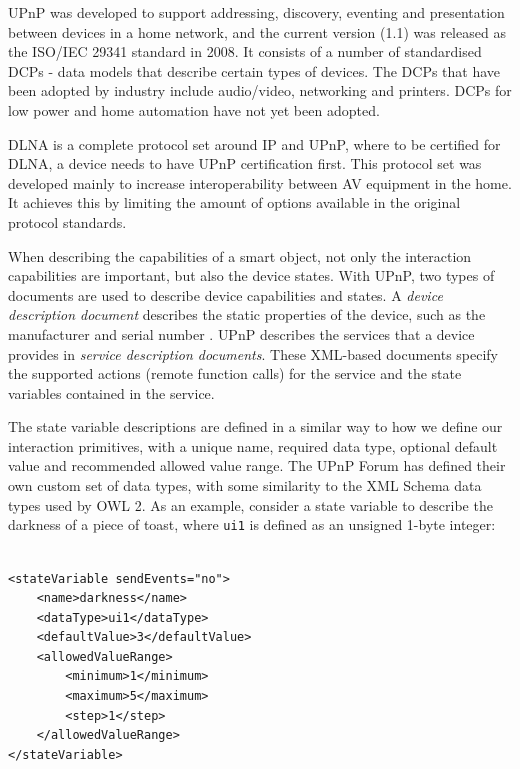 \ac{UPnP} was developed to support addressing, discovery, eventing and presentation between devices in a home network, and the current version (1.1) was released as the ISO/IEC 29341 standard in 2008. It consists of a number of standardised \acp{DCP} - data models that describe certain types of devices. The \acp{DCP} that have been adopted by industry include audio/video, networking and printers. \acp{DCP} for low power and home automation have not yet been adopted.

\ac{DLNA} is a complete protocol set around \ac{IP} and \ac{UPnP}, where to be certified for \ac{DLNA}, a device needs to have \ac{UPnP} certification first. This protocol set was developed mainly to increase interoperability between \ac{AV} equipment in the home. It achieves this by limiting the amount of options available in the original protocol standards.

When describing the capabilities of a smart object, not only the interaction capabilities are important, but also the device states. With \ac{UPnP}, two types of documents are used to describe device capabilities and states. A \emph{device description document} describes the static properties of the device, such as the manufacturer and serial number \cite{Jeronimo2009}. \ac{UPnP} describes the services that a device provides in \emph{service description documents}. These XML-based documents specify the supported actions (remote function calls) for the service and the state variables contained in the service. 

The state variable descriptions are defined in a similar way to how we define our interaction primitives, with a unique name, required data type, optional default value and recommended allowed value range. The \ac{UPnP} Forum has defined their own custom set of data types, with some similarity to the XML Schema data types used by \ac{OWL} 2. As an example, consider a state variable to describe the darkness of a piece of toast, where \texttt{ui1} is defined as an unsigned 1-byte integer:

\begin{verbatim}
	
<stateVariable sendEvents="no">
	<name>darkness</name>
	<dataType>ui1</dataType>
	<defaultValue>3</defaultValue>
	<allowedValueRange>
		<minimum>1</minimum>
		<maximum>5</maximum>
		<step>1</step>
	</allowedValueRange>
</stateVariable>

\end{verbatim}

